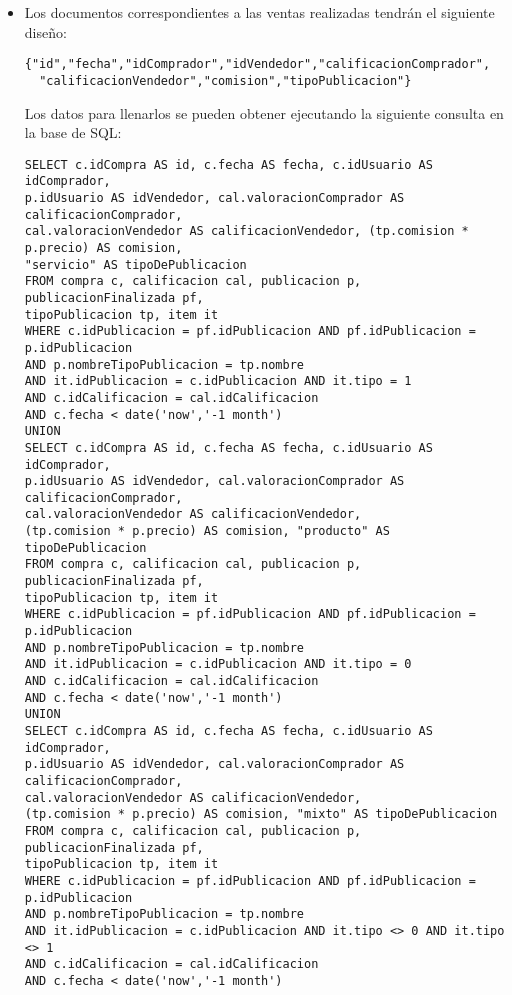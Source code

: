 \begin{itemize}
\item Los documentos correspondientes a las ventas realizadas tendr\'an el siguiente dise\~no:
\begin{verbatim}
{"id","fecha","idComprador","idVendedor","calificacionComprador",
  "calificacionVendedor","comision","tipoPublicacion"}
\end{verbatim}
Los datos para llenarlos se pueden obtener ejecutando la siguiente consulta en la base de SQL:
\begin{verbatim}
SELECT c.idCompra AS id, c.fecha AS fecha, c.idUsuario AS idComprador,
p.idUsuario AS idVendedor, cal.valoracionComprador AS calificacionComprador, 
cal.valoracionVendedor AS calificacionVendedor, (tp.comision * p.precio) AS comision, 
"servicio" AS tipoDePublicacion
FROM compra c, calificacion cal, publicacion p, publicacionFinalizada pf, 
tipoPublicacion tp, item it
WHERE c.idPublicacion = pf.idPublicacion AND pf.idPublicacion = p.idPublicacion 
AND p.nombreTipoPublicacion = tp.nombre 
AND it.idPublicacion = c.idPublicacion AND it.tipo = 1
AND c.idCalificacion = cal.idCalificacion
AND c.fecha < date('now','-1 month')
UNION
SELECT c.idCompra AS id, c.fecha AS fecha, c.idUsuario AS idComprador, 
p.idUsuario AS idVendedor, cal.valoracionComprador AS calificacionComprador, 
cal.valoracionVendedor AS calificacionVendedor, 
(tp.comision * p.precio) AS comision, "producto" AS tipoDePublicacion
FROM compra c, calificacion cal, publicacion p, publicacionFinalizada pf, 
tipoPublicacion tp, item it
WHERE c.idPublicacion = pf.idPublicacion AND pf.idPublicacion = p.idPublicacion 
AND p.nombreTipoPublicacion = tp.nombre 
AND it.idPublicacion = c.idPublicacion AND it.tipo = 0
AND c.idCalificacion = cal.idCalificacion
AND c.fecha < date('now','-1 month')
UNION
SELECT c.idCompra AS id, c.fecha AS fecha, c.idUsuario AS idComprador, 
p.idUsuario AS idVendedor, cal.valoracionComprador AS calificacionComprador, 
cal.valoracionVendedor AS calificacionVendedor, 
(tp.comision * p.precio) AS comision, "mixto" AS tipoDePublicacion
FROM compra c, calificacion cal, publicacion p, publicacionFinalizada pf, 
tipoPublicacion tp, item it
WHERE c.idPublicacion = pf.idPublicacion AND pf.idPublicacion = p.idPublicacion 
AND p.nombreTipoPublicacion = tp.nombre 
AND it.idPublicacion = c.idPublicacion AND it.tipo <> 0 AND it.tipo <> 1
AND c.idCalificacion = cal.idCalificacion
AND c.fecha < date('now','-1 month')
\end{verbatim}

\end{itemize}
